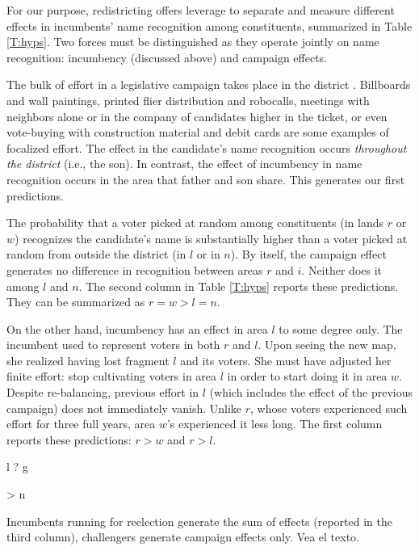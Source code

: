\documentclass[letter,12pt]{article}
\newcommand{\mc}{\multicolumn}
\newcommand{\emm}[1]{\todo[color=red!15, inline]{\textbf{Eric:} #1}}
\begin{document}
\emm{Aquí voy}

For our purpose, redistricting offers leverage to separate and measure different effects in incumbents' name recognition among constituents, summarized in Table \ref{T:hyps}. Two forces must be distinguished as they operate jointly on name recognition: incumbency (discussed above) and campaign effects.

The bulk of effort in a legislative campaign takes place in the district \citep{langston.nd}. Billboards and wall paintings, printed flier distribution and robocalls, meetings with neighbors alone or in the company of candidates higher in the ticket, or even vote-buying with construction material and debit cards are some examples of focalized effort. The effect in the candidate's name recognition occurs \emph{throughout the district} (i.e., the son). In contrast, the effect of incumbency in name recognition occurs in the area that father and son share. This generates our first predictions.

The probability that a voter picked at random among constituents (in lands $r$ or $w$) recognizes the candidate's name is substantially higher than a voter picked at random from outside the district (in $l$ or in $n$). By itself, the campaign effect generates no difference in recognition between areas $r$ and $i$. Neither does it among $l$ and $n$. The second column in Table \ref{T:hyps} reports these predictions. They can be summarized as $r=w>l=n$. 

On the other hand, incumbency has an effect in area $l$ to some degree only. The incumbent used to represent voters in both $r$ and $l$. Upon seeing the new map, she realized having lost fragment $l$ and its voters. She must have adjusted her finite effort: stop cultivating voters in area $l$ in order to start doing it in area $w$. Despite re-balancing, previous effort in $l$ (which includes the effect of the previous campaign) does not immediately vanish. Unlike $r$, whose voters experienced such effort for three full years, area $w$'s experienced it less long. The first column reports these predictions: $r>w$ and $r>l$. 

l ? g

> n

Incumbents running for reelection generate the sum of effects (reported in the third column), challengers generate campaign effects only. Vea el texto.

\end{document}
